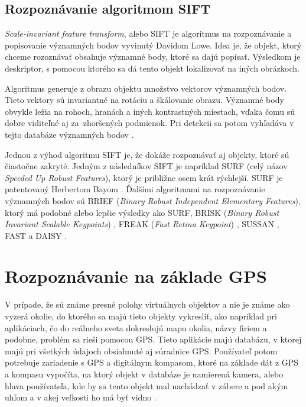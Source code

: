\subsection{Rozpoznávanie algoritmom SIFT}
\emph{Scale-invariant feature transform}, alebo SIFT je algoritmus na rozpoznávanie a popisovanie významných bodov vyvinutý Davidom Lowe. Idea je, že objekt, ktorý chceme rozoznávať obsahuje významné body, ktoré sa dajú popísať. Výsledkom je deskriptor, s pomocou ktorého sa dá tento objekt
lokalizovať na iných obrázkoch.

Algoritmus generuje z obrazu objektu množstvo vektorov významných bodov. Tieto vektory sú invariantné na rotáciu a škálovanie obrazu. Významné body obvykle ležia na rohoch, hranách a iných kontrastných miestach, vďaka čomu sú dobre viditeľné aj za~zhoršených podmienok. Pri detekcii sa potom vyhľadáva v tejto databáze významných bodov \cite{Lowe99, Volosin11}.

Jednou z výhod algoritmu SIFT je, že dokáže rozpoznávať aj objekty, ktoré sú čiastočne zakryté. Jedným z následníkov SIFT je napríklad SURF (celý názov \emph{Speeded Up Robust Features}), ktorý je približne osem krát rýchlejší. SURF je
patentovaný Herbertom Bayom \cite{Bay06}. Ďalšími algoritmami na rozpoznávanie významných bodov sú BRIEF \cite{Calonder10} (\emph{Binary Robust Independent Elementary Features}), ktorý má podobné alebo lepšie výsledky ako SURF, BRISK (\emph{Binary Robust Invariant Scalable
Keypoints}) \cite{Leutenegger11}, FREAK (\emph{Fast Retina Keypoint}) \cite{Alahi12}, SUSSAN \cite{Smith97}, FAST \cite{Tuzel06} a DAISY \cite{Tola10}.

\section{Rozpoznávanie na základe GPS}

V prípade, že sú známe presné polohy virtuálnych objektov a nie je známe ako vyzerá okolie, do ktorého sa majú tieto objekty vykresliť, ako napríklad pri aplikáciach, čo do reálneho sveta dokreslujú mapu okolia, názvy firiem a podobne, problém sa rieši pomocou GPS. Tieto aplikácie majú databázu, v ktorej majú pri všetkých údajoch obsiahnuté aj súradnice GPS. Používateľ potom potrebuje zariadenie s GPS a digitálnym kompasom, ktoré na základe dát z GPS a kompasu vypočíta, na ktorý objekt v databáze je namierená kamera, alebo hlava používateľa, kde by sa tento objekt mal nachádzať v zábere a pod akým uhľom a v akej veľkosti ho má byť vidno \cite{Bimber05}.

